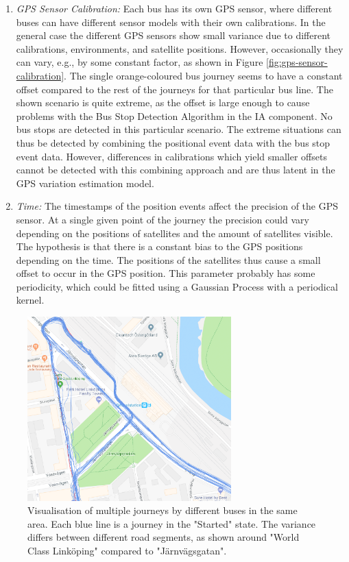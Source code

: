 \begin{enumerate}
    \item \textit{GPS Sensor Calibration:}
    Each bus has its own GPS sensor, where different buses can have different sensor models with their own calibrations.
    In the general case the different GPS sensors show small variance due to different calibrations, environments, and satellite positions.
    However, occasionally they can vary, e.g., by some constant factor, as shown in Figure \ref{fig:gps-sensor-calibration}.
    The single orange-coloured bus journey seems to have a constant offset compared to the rest of the journeys for that particular bus line.
    The shown scenario is quite extreme, as the offset is large enough to cause problems with the Bus Stop Detection Algorithm in the IA component.
    No bus stops are detected in this particular scenario.
    The extreme situations can thus be detected by combining the positional event data with the bus stop event data.
    However, differences in calibrations which yield smaller offsets cannot be detected with this combining approach and are thus latent in the GPS variation estimation model.

    \item \textit{Time:}
    The timestamps of the position events affect the precision of the GPS sensor.
    At a single given point of the journey the precision could vary depending on the positions of satellites and the amount of satellites visible.
    The hypothesis is that there is a constant bias to the GPS positions depending on the time.
    The positions of the satellites thus cause a small offset to occur in the GPS position.
    This parameter probably has some periodicity, which could be fitted using a Gaussian Process with a periodical kernel.
    
\end{enumerate} 


\begin{figure}[ht!]
    \centering
    \includegraphics[width=0.7\textwidth]{figures/gps_variation}
    \caption[Visualisation of multiple journeys by different buses in the same area]
    {\small Visualisation of multiple journeys by different buses in the same area.
    Each blue line is a journey in the "Started" state.
    The variance differs between different road segments, as shown around "World Class Linköping" compared to "Järnvägsgatan".}
    \label{fig:gps-variation}
\end{figure}

